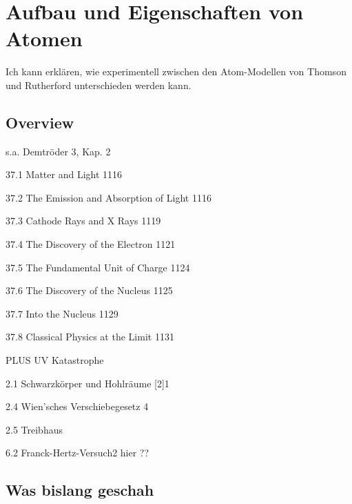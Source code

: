 \renewcommand{\lastmod}{10. September 2024}
\renewcommand{\chapterauthors}{Markus Lippitz}

\chapter{Aufbau und Eigenschaften von Atomen}





Ich kann erklären, wie experimentell zwischen den Atom-Modellen von Thomson und Rutherford unterschieden werden kann.

\section{Overview}

s.a. Demtröder 3, Kap. 2


37.1 Matter and Light 1116

37.2 The Emission and Absorption of Light 1116

37.3 Cathode Rays and X Rays 1119

37.4 The Discovery of the Electron 1121

37.5 The Fundamental Unit of Charge 1124

37.6 The Discovery of the Nucleus 1125

37.7 Into the Nucleus 1129

37.8 Classical Physics at the Limit 1131


PLUS UV Katastrophe

2.1 Schwarzkörper und Hohlräume [2]1	



2.4 Wien’sches Verschiebegesetz 4	

2.5 Treibhaus

6.2 Franck-Hertz-Versuch2	hier ??





\section{Was bislang geschah}

